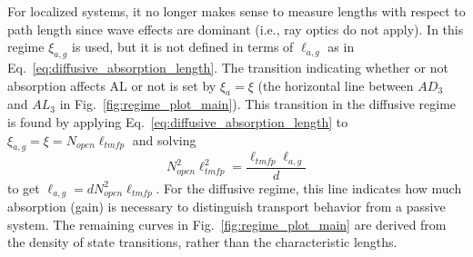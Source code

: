 For localized systems, it no longer makes sense to measure lengths with respect to path length since wave effects are dominant (i.e., ray optics do not apply). In this regime $\xi_{a,g}$ is used, but it is not defined in terms of $\ell_{a,g}$ as in Eq.~\ref{eq:diffusive_absorption_length}. The transition indicating whether or not absorption affects AL or not is set by $\xi_{a} = \xi$ (the horizontal line between $AD_3$ and $AL_3$ in Fig.~\ref{fig:regime_plot_main}). This transition in the diffusive regime is found by applying Eq.~\ref{eq:diffusive_absorption_length} to $\xi_{a,g} = \xi = N_{open} \ell_{tmfp}$ and solving 
\begin{equation}
N_{open}^2 \ell_{tmfp}^2 = \frac{\ell_{tmfp}\ell_{a,g}}{d}
\end{equation}
to get $\ell_{a,g} =d N_{open}^2 \ell_{tmfp}$. For the diffusive regime, this line indicates how much absorption (gain) is necessary to distinguish transport behavior from a passive system. The remaining curves in Fig.~\ref{fig:regime_plot_main} are derived from the density of state transitions, rather than the characteristic lengths.

